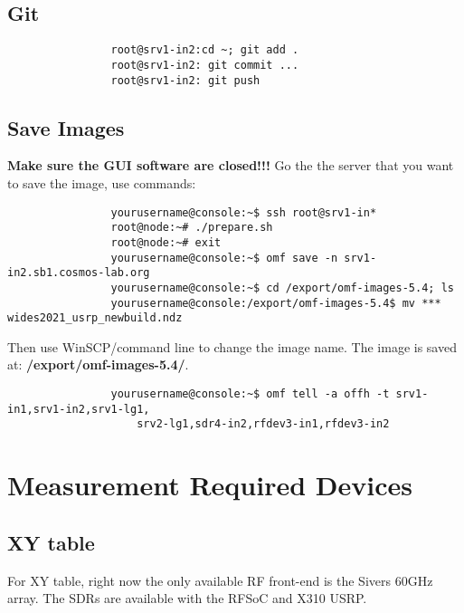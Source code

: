 \documentclass{article}
\begin{document}
    \subsection{Git}
        \begin{verbatim}
                root@srv1-in2:cd ~; git add .
                root@srv1-in2: git commit ...
                root@srv1-in2: git push
            \end{verbatim}
            
    \subsection{Save Images}  \label{usrp section: save image}
    \textbf{Make sure the GUI software are closed!!!}
            Go the the server that you want to save the image, use commands:
            \begin{verbatim}
                yourusername@console:~$ ssh root@srv1-in*
                root@node:~# ./prepare.sh
                root@node:~# exit
                yourusername@console:~$ omf save -n srv1-in2.sb1.cosmos-lab.org
                yourusername@console:~$ cd /export/omf-images-5.4; ls
                yourusername@console:/export/omf-images-5.4$ mv *** wides2021_usrp_newbuild.ndz
            \end{verbatim}
            
            Then use WinSCP/command line to change the image name. The image is saved at: \textbf{/export/omf-images-5.4/}. 
            
            \begin{verbatim}
                yourusername@console:~$ omf tell -a offh -t srv1-in1,srv1-in2,srv1-lg1,
                    srv2-lg1,sdr4-in2,rfdev3-in1,rfdev3-in2
            \end{verbatim}



\section{Measurement Required Devices}
    \subsection{XY table}
    For XY table, right now the only available RF front-end is the Sivers 60GHz array. The SDRs are available with the RFSoC and X310 USRP. 

    
    
    
\newpage
\end{document}
